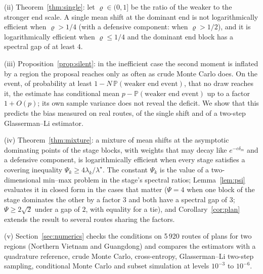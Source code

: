 \documentclass[pdflatex,sn-mathphys-ay]{sn-jnl}%
\theoremstyle{thmstyleone}%
\theoremstyle{thmstylethree}%
\theoremstyle{thmstyletwo}%
\renewcommand{\P}{\mathbb{P}}
\begin{document}
(ii) Theorem~\ref{thm:single}: let $\varrho\in(0,1]$ be the ratio of the weaker to the
stronger end scale. A single mean shift at the dominant end is not logarithmically
efficient when $\varrho>1/4$ (with a defensive component: when $\varrho>1/2$), and it
is logarithmically efficient when $\varrho\le1/4$ and the dominant end block has a
spectral gap of at least $4$.

(iii) Proposition~\ref{prop:silent}: in the inefficient case the second moment is
inflated by a region the proposal reaches only as often as crude Monte Carlo does. On the
event, of probability at least $1-N\,\P(\text{weaker end event})$, that no draw reaches
it, the estimate has conditional mean $p-\P(\text{weaker end event})$ up to a factor
$1+O(p)$; its own sample variance does not reveal the deficit. We show that this
predicts the bias measured on real routes, of the single shift and of a two-step
Glasserman--Li estimator.

(iv) Theorem~\ref{thm:mixture}: a mixture of mean shifts at the asymptotic dominating
points of the stage blocks, with weights that may decay like $e^{-c\delta_m}$ and a
defensive component, is logarithmically efficient when every stage satisfies a covering
inequality $\Psi_k\ge4\lambda_k/\lambda^\star$. The constant $\Psi_k$ is the value of a
two-dimensional min--max problem in the stage's spectral ratios; Lemma~\ref{lem:psi}
evaluates it in closed form in the cases that matter ($\Psi=4$ when one block of the stage
dominates the other by a factor $3$ and both have a spectral gap of $3$; $\Psi\ge2\sqrt2$
under a gap of $2$, with equality for a tie), and
Corollary~\ref{cor:plan} extends the result to several routes sharing the factors.

(v) Section~\ref{sec:numerics} checks the conditions on 5\,920 routes of plans for two
regions (Northern Vietnam and Guangdong) and compares the estimators with a
quadrature reference, crude Monte Carlo, cross-entropy, Glasserman--Li two-step
sampling, conditional Monte Carlo and subset simulation at levels $10^{-3}$ to
$10^{-6}$.
\end{document}
